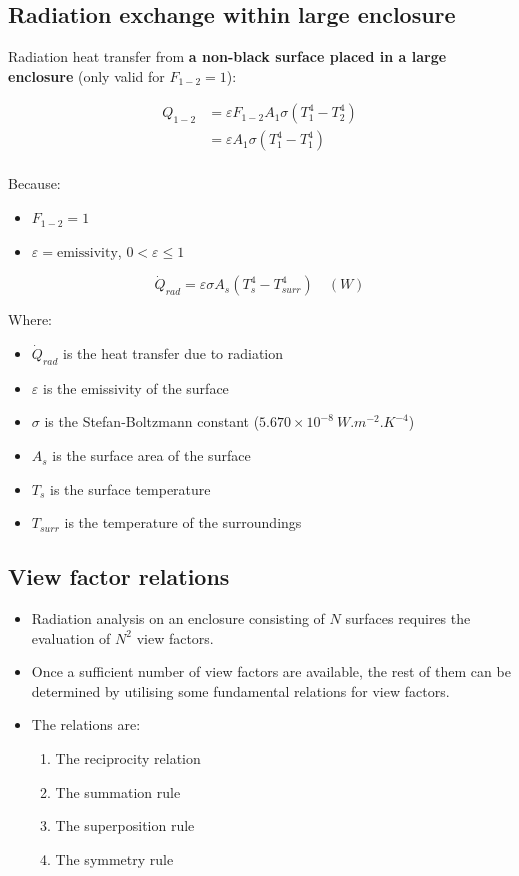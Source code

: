 \documentclass[11pt]{article}
\begin{document}
\subsection{Radiation exchange within large enclosure}
\label{sec:orge9bd387}
Radiation heat transfer from \textbf{a non-black surface placed in a large enclosure} (only valid for \(F_{1-2} = 1\)):

\begin{align*}
Q_{1-2} &= \varepsilon F_{1-2} A_1 \sigma (T_1^4 - T_2^4) \\
&= \varepsilon A_1 \sigma (T_1^4 - T_1^4) \\
\end{align*}

Because:
\begin{itemize}
\item \(F_{1-2} = 1\)
\item \(\varepsilon = \text{emissivity}\), \(0 < \varepsilon \le 1\)
\end{itemize}

\[\dot{Q}_{rad} = \varepsilon \sigma A_s (T_s^4 - T_{surr}^4) \quad (\unit{W})\]

Where:
\begin{itemize}
\item \(\dot{Q}_{rad}\) is the heat transfer due to radiation
\item \(\varepsilon\) is the emissivity of the surface
\item \(\sigma\) is the Stefan-Boltzmann constant (\(5.670 \times 10^{-8} \ \unit{W.m^{-2}.K^{-4}}\))
\item \(A_s\) is the surface area of the surface
\item \(T_s\) is the surface temperature
\item \(T_{surr}\) is the temperature of the surroundings
\end{itemize}

\subsection{View factor relations}
\label{sec:orgdaf9c0e}
\begin{itemize}
\item Radiation analysis on an enclosure consisting of \(N\) surfaces requires the evaluation of \(N^2\) view factors.
\item Once a sufficient number of view factors are available, the rest of them can be determined by utilising some fundamental relations for view factors.
\item The relations are:
\begin{enumerate}
\item The reciprocity relation
\item The summation rule
\item The superposition rule
\item The symmetry rule
\end{enumerate}
\end{itemize}
\end{document}
